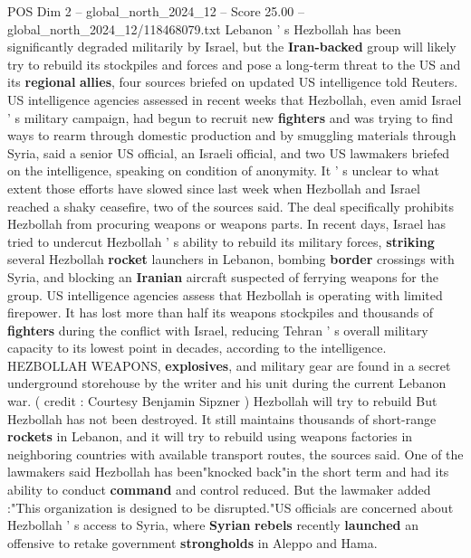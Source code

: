 \begin{textsample}{POS Dim 2 – global\_north\_2024\_12 – Score 25.00 – global\_north\_2024\_12/118468079.txt}  \label{ex:f2_pos_271}
Lebanon ' s Hezbollah has been significantly degraded militarily by Israel, but the \textbf{Iran-backed} group will likely try to rebuild its stockpiles and forces and pose a long-term threat to the US and its \textbf{regional} \textbf{allies}, four sources briefed on updated US intelligence told Reuters.
US intelligence agencies assessed in recent weeks that Hezbollah, even amid Israel ' s military campaign, had begun to recruit new \textbf{fighters} and was trying to find ways to rearm through domestic production and by smuggling materials through Syria, said a senior US official, an Israeli official, and two US lawmakers briefed on the intelligence, speaking on condition of anonymity.
It ' s unclear to what extent those efforts have slowed since last week when Hezbollah and Israel reached a shaky ceasefire, two of the sources said.
The deal specifically prohibits Hezbollah from procuring weapons or weapons parts.
In recent days, Israel has tried to undercut Hezbollah ' s ability to rebuild its military forces, \textbf{striking} several Hezbollah \textbf{rocket} launchers in Lebanon, bombing \textbf{border} crossings with Syria, and blocking an \textbf{Iranian} aircraft suspected of ferrying weapons for the group.
US intelligence agencies assess that Hezbollah is operating with limited firepower.
It has lost more than half its weapons stockpiles and thousands of \textbf{fighters} during the conflict with Israel, reducing Tehran ' s overall military capacity to its lowest point in decades, according to the intelligence.
HEZBOLLAH WEAPONS, \textbf{explosives}, and military gear are found in a secret underground storehouse by the writer and his unit during the current Lebanon war. ( credit : Courtesy Benjamin Sipzner ) Hezbollah will try to rebuild But Hezbollah has not been destroyed.
It still maintains thousands of short-range \textbf{rockets} in Lebanon, and it will try to rebuild using weapons factories in neighboring countries with available transport routes, the sources said.
One of the lawmakers said Hezbollah has been"knocked back"in the short term and had its ability to conduct \textbf{command} and control reduced.
But the lawmaker added :"This organization is designed to be disrupted."US officials are concerned about Hezbollah ' s access to Syria, where \textbf{Syrian} \textbf{rebels} recently \textbf{launched} an offensive to retake government \textbf{strongholds} in Aleppo and Hama.

\end{textsample}
